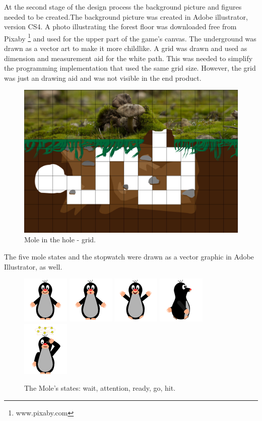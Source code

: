 At the second stage of the design process the background picture and figures needed to be created.The background picture was created in Adobe illustrator, version CS4. A photo illustrating the forest floor was downloaded free from Pixaby \footnote{www.pixaby.com} and used for the upper part of the game’s canvas. The underground was drawn as a vector art to make it more childlike. 
A grid was drawn and used as dimension and measurement aid for the white path. This was needed to simplify the programming implementation that used the same grid size. However, the grid was just an drawing aid and was not visible in the end product.

\begin{figure}[h]  %
  \centering
  \includegraphics[width=.5\textwidth]{figures/Mole-in-the-hole-800x1200-GRID.jpg}
  \caption[Mole in the hole grid.]{Mole in the hole - grid.}
  \label{fig:setup}
\end{figure}

The five mole states and the stopwatch were drawn as a vector graphic in Adobe Illustrator, as well.

\begin{figure}[h]  %
  \centering
  \includegraphics[width=.1\textwidth]{figures/MoleWait.png}
   \includegraphics[width=.1\textwidth]{figures/MoleAttention.png}
   \includegraphics[width=.1\textwidth]{figures/MoleJump.png}
   \includegraphics[width=.1\textwidth]{figures/MoleGo.png}
   \includegraphics[width=.1\textwidth]{figures/MoleKaBoom.png}
  \caption[Mole's states.]{ The Mole's states: wait, attention, ready, go, hit.}
  \label{fig:setup}
\end{figure}

